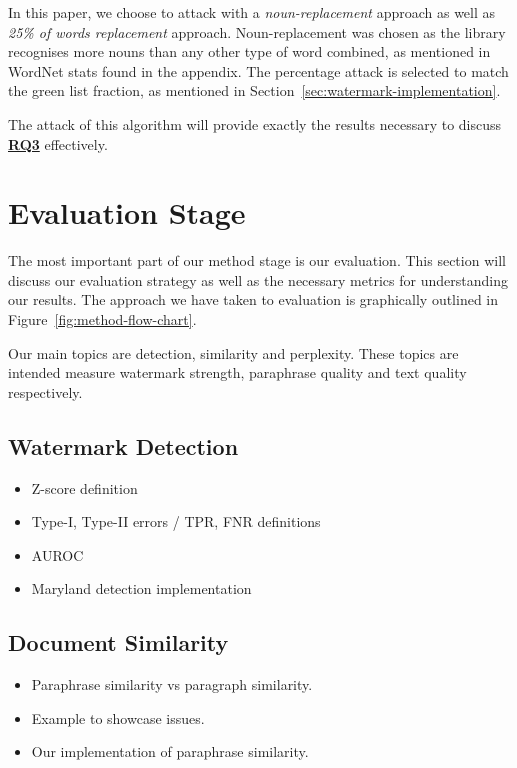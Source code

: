 \documentclass{l4proj}
\theoremstyle{definition}
\begin{document}
        In this paper, we choose to attack with a \emph{noun-replacement} approach as well as \emph{25\% of words replacement} approach. Noun-replacement was chosen as the library recognises more nouns than any other type of word combined, as mentioned in WordNet stats found in the appendix. The percentage attack is selected to match the green list fraction, as mentioned in Section~\ref{sec:watermark-implementation}. 

        The attack of this algorithm will provide exactly the results necessary to discuss \hyperref[sec:research-questions]{\textbf{RQ3}} effectively.

\section{Evaluation Stage}
    The most important part of our method stage is our evaluation. This section will discuss our evaluation strategy as well as the necessary metrics for understanding our results. The approach we have taken to evaluation is graphically outlined in Figure~\ref{fig:method-flow-chart}. 
    
    Our main topics are detection, similarity and perplexity. These topics are intended measure watermark strength, paraphrase quality and text quality respectively. 
    
    \subsection{Watermark Detection}
        \begin{itemize}
            \item Z-score definition
            \item Type-I, Type-II errors / TPR, FNR definitions
            \item AUROC 
            \item Maryland detection implementation 
        \end{itemize}
        
    \subsection{Document Similarity}
        \begin{itemize}
            \item Paraphrase similarity vs paragraph similarity.
            \item Example to showcase issues.
            \item Our implementation of paraphrase similarity.
        \end{itemize}
\end{document}
